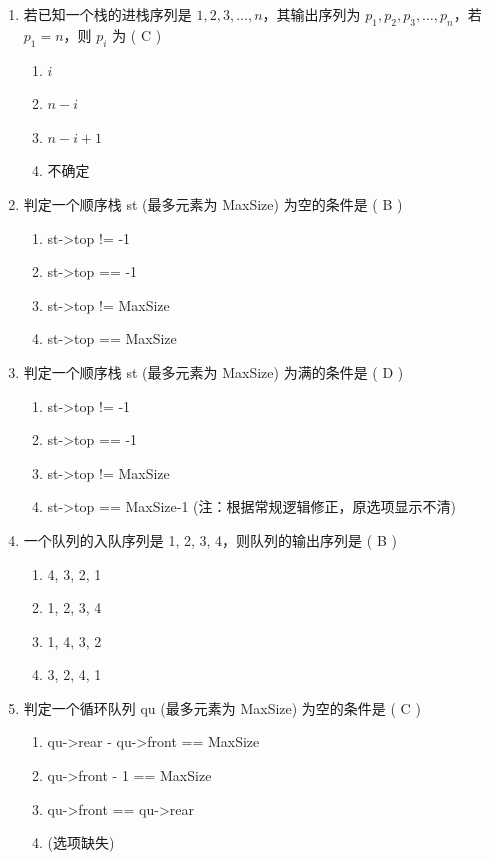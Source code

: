 \documentclass[12pt, a4paper]{article}
\begin{document}
\begin{enumerate}[label=\arabic*.]
    \item 若已知一个栈的进栈序列是 $1, 2, 3, \dots, n$，其输出序列为 $p_1, p_2, p_3, \dots, p_n$，若 $p_1=n$，则 $p_i$ 为 ( C )
    \begin{enumerate}
        \item $i$
        \item $n-i$
        \item $n-i+1$
        \item 不确定
    \end{enumerate}

    \item 判定一个顺序栈 st (最多元素为 MaxSize) 为空的条件是 ( B )
    \begin{enumerate}
        \item st->top != -1
        \item st->top == -1
        \item st->top != MaxSize
        \item st->top == MaxSize
    \end{enumerate}

    \item 判定一个顺序栈 st (最多元素为 MaxSize) 为满的条件是 ( D )
    \begin{enumerate}
        \item st->top != -1
        \item st->top == -1
        \item st->top != MaxSize
        \item st->top == MaxSize-1 (注：根据常规逻辑修正，原选项显示不清)
    \end{enumerate}

    \item 一个队列的入队序列是 1, 2, 3, 4，则队列的输出序列是 ( B )
    \begin{enumerate}
        \item 4, 3, 2, 1
        \item 1, 2, 3, 4
        \item 1, 4, 3, 2
        \item 3, 2, 4, 1
    \end{enumerate}

    \item 判定一个循环队列 qu (最多元素为 MaxSize) 为空的条件是 ( C )
    \begin{enumerate}
        \item qu->rear - qu->front == MaxSize
        \item qu->front - 1 == MaxSize
        \item qu->front == qu->rear
        \item (选项缺失)
    \end{enumerate}


\end{enumerate}
\end{document}
